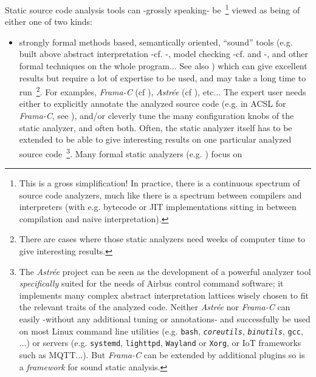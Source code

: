 Static source code analysis tools can -grossly speaking-
be~\footnote{This is a gross simplification! In practice, there is a
  continuous spectrum of source code analyzers, much like there is a
  spectrum between compilers and interpreters (with e.g. bytecode or
  JIT implementations sitting in between compilation and naive
  interpretation).} viewed as being of either one of two kinds:

\begin{itemize}
  \item strongly formal methods based, semantically oriented,
    ``sound'' tools (e.g. built above abstract interpretation -cf.
    \cite{Cousot:2014:AIP,CousotCousot77-1}-, model checking -cf.
    \cite{Schlich:2010:MCS} and \cite{Jhala:2009:SMC}-, and other
    formal techniques on the whole program... See also
    \cite{Andreasen:2017:SAI}) which can give excellent results but
    require a lot of expertise to be used, and may take a long time to
    run~\footnote{There are cases where those static analyzers need
      weeks of computer time to give interesting results.}. For
    examples, \emph{Frama-C} (cf \cite{Cuoq:2012:Frama-C}),
    \emph{Astrée} (cf \cite{Mine:2015:TIU}), etc... The expert user
    needs either to explicitly annotate the analyzed source code
    (e.g. in ACSL for \emph{Frama-C}, see \cite{Baudin:2018:ACSL,
      Delahaye:2013:CSL, Amin:2017:LAW}), and/or cleverly tune the
    many configuration knobs of the static analyzer, and often
    both. Often, the static analyzer itself has to be extended to be
    able to give interesting results on one particular analyzed source
    code~\footnote{The \emph{Astrée} project can be seen as the
      development of a powerful analyzer tool \emph{specifically}
      suited for the needs of Airbus control command software; it
      implements many complex abstract interpretation lattices wisely
      chosen to fit the relevant traits of the analyzed code. Neither
      \emph{Astrée} nor \emph{Frama-C} can easily -without any
      additional tuning or annotations- and successfully be used on
      most Linux command line utilities (e.g. \texttt{bash},
      \texttt{\emph{coreutils}}, \texttt{\emph{binutils}},
      \texttt{gcc}, ...)  or servers (e.g. \texttt{systemd},
      \texttt{lighttpd}, \texttt{Wayland} or \texttt{Xorg}, or IoT
      frameworks such as MQTT...). But \emph{Frama-C} can be extended
      by additional plugins so is a \emph{framework} for sound static
      analysis.}. Many formal static analyzers
    (e.g. \cite{Greenaway:2014:DSS, Vedala:2012:ADP}) focus on

\end{itemize}

